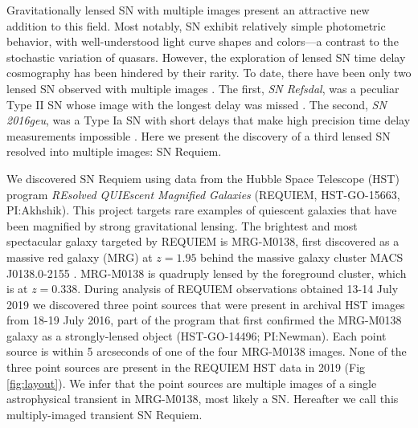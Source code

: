 \documentclass[12pt,dvipsnames]{article}
\def\SNABC{SN Requiem\xspace}
\begin{document}
Gravitationally lensed SN with multiple images present an attractive new addition to this field. Most notably, SN exhibit relatively simple photometric behavior, with well-understood light curve shapes and colors---a contrast to the stochastic variation of quasars.  However, the exploration of lensed SN time delay cosmography has been hindered by their rarity.  To date, there have been only two lensed SN observed with multiple images \cite{kelly_multiple_2015,goobar_iptf16geu:_2017}. The first, {\it SN Refsdal}, was a peculiar Type II SN whose image with the longest delay was missed \cite{kelly_SNRefsdal_2016}. The second, {\it SN 2016geu}, was a Type Ia SN with short delays that make high precision time delay measurements impossible \cite{dhawan_magnification_2020}. Here we present the discovery 
of a third lensed SN resolved into multiple images: \SNABC. 

We discovered SN Requiem using data from the Hubble Space Telescope (HST) program {\it REsolved QUIEscent Magnified Galaxies} (REQUIEM, HST-GO-15663, PI:Akhshik). This project targets rare examples of quiescent galaxies that have been magnified by strong gravitational lensing. %
The brightest and most spectacular galaxy targeted by REQUIEM
is MRG-M0138, first discovered as a massive red galaxy (MRG) at $z=1.95$ \cite{newman_resolving_2018} behind the massive galaxy cluster MACS J0138.0-2155 \cite{ebeling_macs_2001}.
MRG-M0138 is quadruply lensed by the foreground cluster, which is at $z=0.338$.  
During analysis of REQUIEM observations obtained 13-14 July 2019 \cite{materials_methods_2020} we discovered three point 
sources that were present in archival HST images from 18-19 July 2016, part of the program 
that first confirmed the MRG-M0138 galaxy as a strongly-lensed object (HST-GO-14496; PI:Newman). 
Each point source is within 5 arcseconds of one of the four MRG-M0138 images.  None of the
three point sources are present in the REQUIEM HST data in 2019 (Fig \ref{fig:layout}). We infer that 
the point sources are multiple images of a single astrophysical 
transient in MRG-M0138, most likely a SN. Hereafter we call this multiply-imaged transient \SNABC.
\end{document}
